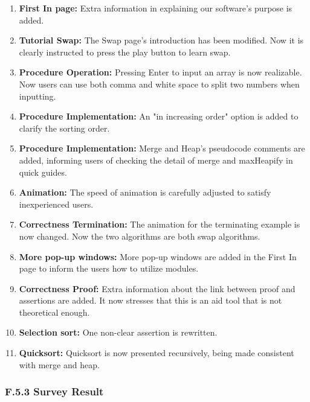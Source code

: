 \documentclass[
]{article}
\begin{document}
\begin{enumerate}
\def\labelenumi{\arabic{enumi}.}
\item
  \textbf{First In page:} Extra information in explaining our software's
  purpose is added.
\item
  \textbf{Tutorial Swap:} The Swap page's introduction has been
  modified. Now it is clearly instructed to press the play button to
  learn swap.
\item
  \textbf{Procedure Operation:} Pressing Enter to input an array is now
  realizable. Now users can use both comma and white space to split two
  numbers when inputting.
\item
  \textbf{Procedure Implementation:} An "in increasing order" option is
  added to clarify the sorting order.
\item
  \textbf{Procedure Implementation:} Merge and Heap's pseudocode
  comments are added, informing users of checking the detail of merge
  and maxHeapify in quick guides.
\item
  \textbf{Animation:} The speed of animation is carefully adjusted to
  satisfy inexperienced users.
\item
  \textbf{Correctness Termination:} The animation for the terminating
  example is now changed. Now the two algorithms are both swap
  algorithms.
\item
  \textbf{More pop-up windows:} More pop-up windows are added in the
  First In page to inform the users how to utilize modules.
\item
  \textbf{Correctness Proof:} Extra information about the link between
  proof and assertions are added. It now stresses that this is an aid
  tool that is not theoretical enough.
\item
  \textbf{Selection sort:} One non-clear assertion is rewritten.
\item
  \textbf{Quicksort:} Quicksort is now presented recursively, being made
  consistent with merge and heap.
\end{enumerate}

\hypertarget{header-n233}{%
\subsubsection{F.5.3 Survey Result}\label{header-n233}}
\end{document}
